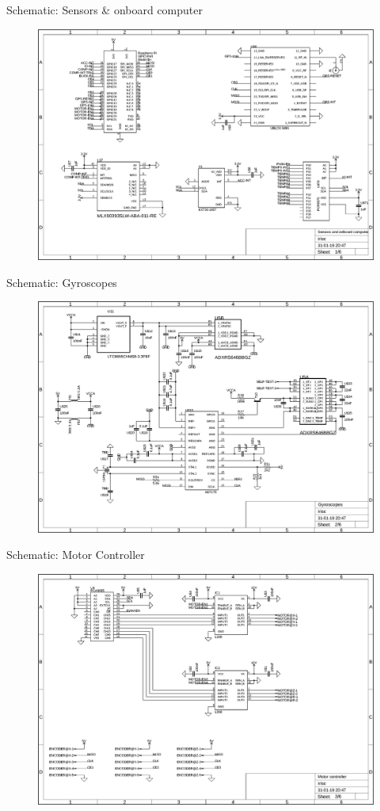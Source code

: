 \documentclass[11pt, aspectratio=169]{beamer}
\begin{document}
\begin{frame}{Schematic: Sensors \& onboard computer}
	\vspace{-.2cm}
	\begin{figure}
		\includegraphics[width=.68\textwidth]{figures/schematics/elec01.png}
	\end{figure}
\end{frame}

\begin{frame}{Schematic: Gyroscopes}
	\vspace{-.2cm}
	\begin{figure}
		\includegraphics[width=.68\textwidth]{figures/schematics/elec02.png}
	\end{figure}
\end{frame}

\begin{frame}{Schematic: Motor Controller}
	\vspace{-.2cm}
	\begin{figure}
		\includegraphics[width=.68\textwidth]{figures/schematics/elec03.png}
	\end{figure}
\end{frame}
\end{document}
